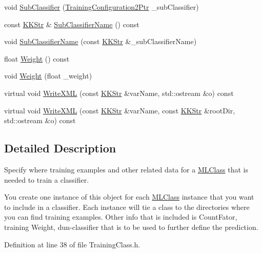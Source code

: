 \begin{DoxyCompactItemize}
\item 
void \hyperlink{class_k_k_m_l_l_1_1_training_class_aca65ff9a062c0a69af4acb40488e2037}{Sub\+Classifier} (\hyperlink{namespace_k_k_m_l_l_a5da4b334417f8c9e4e2fd5924da7fe62}{Training\+Configuration2\+Ptr} \+\_\+sub\+Classifier)
\item 
const \hyperlink{class_k_k_b_1_1_k_k_str}{K\+K\+Str} \& \hyperlink{class_k_k_m_l_l_1_1_training_class_a3779313cdd65a33409a328935bfb60d9}{Sub\+Classifier\+Name} () const 
\item 
void \hyperlink{class_k_k_m_l_l_1_1_training_class_aba851a85fb498942fffb36d80d99ad0e}{Sub\+Classifier\+Name} (const \hyperlink{class_k_k_b_1_1_k_k_str}{K\+K\+Str} \&\+\_\+sub\+Classifier\+Name)
\item 
float \hyperlink{class_k_k_m_l_l_1_1_training_class_a87f207a7a2be1fd926c7eb40cd8d2976}{Weight} () const 
\item 
void \hyperlink{class_k_k_m_l_l_1_1_training_class_a0c44d341fa2153e6d10fb2fb38140067}{Weight} (float \+\_\+weight)
\item 
virtual void \hyperlink{class_k_k_m_l_l_1_1_training_class_a88f0762ea03cafcf0f38d8005ba4f541}{Write\+X\+ML} (const \hyperlink{class_k_k_b_1_1_k_k_str}{K\+K\+Str} \&var\+Name, std\+::ostream \&o) const 
\item 
virtual void \hyperlink{class_k_k_m_l_l_1_1_training_class_ae9d408400af8ed8f549107469b6fcc02}{Write\+X\+ML} (const \hyperlink{class_k_k_b_1_1_k_k_str}{K\+K\+Str} \&var\+Name, const \hyperlink{class_k_k_b_1_1_k_k_str}{K\+K\+Str} \&root\+Dir, std\+::ostream \&o) const 
\end{DoxyCompactItemize}


\subsection{Detailed Description}
Specify where training examples and other related data for a \hyperlink{class_k_k_m_l_l_1_1_m_l_class}{M\+L\+Class} that is needed to train a classifier. 

You create one instance of this object for each \hyperlink{class_k_k_m_l_l_1_1_m_l_class}{M\+L\+Class} instance that you want to include in a classifier. Each instance will tie a class to the directories where you can find training examples. Other info that is included is \textquotesingle{}Count\+Fator\textquotesingle{}, training Weight, dun-\/classifier that is to be used to further define the prediction. 

Definition at line 38 of file Training\+Class.\+h.



